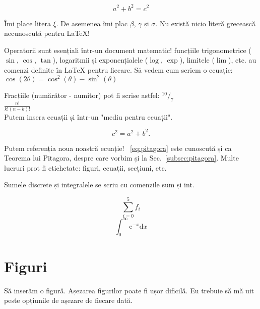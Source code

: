 \documentclass[12pt]{article}
\begin{document}
\[a^2 + b^2 = c^2 \]

Îmi place litera $\xi$. De asemenea îmi plac $\beta$, $\gamma$ și
$\sigma$. Nu există nicio literă grecească necunoscută pentru LaTeX!

Operatorii sunt esențiali într-un document matematic!
funcțiile trigonometrice ($\sin$, $\cos$, $\tan$),
logaritmii și exponențialele ($\log$, $\exp$),
limitele ($\lim$), etc.
au comenzi definite în LaTeX pentru fiecare.
Să vedem cum scriem o ecuație: \\

$\cos(2\theta) = \cos^{2}(\theta) - \sin^{2}(\theta)$

Fracțiile (numărător - numitor) pot fi scrise astfel:
$^{10}/_{7}$ \\

$\frac{n!}{k!(n - k)!}$ \\

Putem insera ecuații și într-un "mediu pentru ecuații".

\begin{equation} %
    c^2 = a^2 + b^2.
    \label{eq:pitagora} %
\end{equation}

Putem referenția noua noastră ecuație!
~\ref{eq:pitagora} este cunoscută și ca Teorema lui Pitagora, despre care vorbim și la Sec.~\ref{subsec:pitagora}. Multe lucruri prot fi etichetate:
figuri, ecuații, secțiuni, etc.

Sumele discrete și integralele se scriu cu comenzile sum și int.

\begin{equation}
  \sum_{i=0}^{5} f_{i}
\end{equation}
\begin{equation}
  \int_{0}^{\infty} \mathrm{e}^{-x} \mathrm{d}x
\end{equation}

\section{Figuri}

Să inserăm o figură. Așezarea figurilor poate fi ușor dificilă.
Eu trebuie să mă uit peste opțiunile de așezare de fiecare dată.
\end{document}
